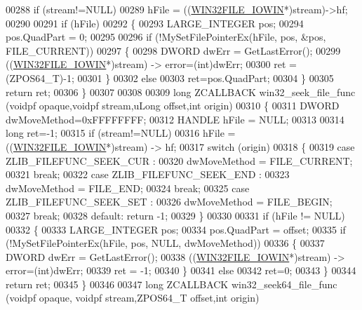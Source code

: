 \begin{DoxyCode}
00288     \textcolor{keywordflow}{if} (stream!=NULL)
00289         hFile = ((\hyperlink{struct_w_i_n32_f_i_l_e___i_o_w_i_n}{WIN32FILE\_IOWIN}*)stream)->hf;
00290 
00291     \textcolor{keywordflow}{if} (hFile)
00292     \{
00293         LARGE\_INTEGER pos;
00294         pos.QuadPart = 0;
00295 
00296         \textcolor{keywordflow}{if} (!MySetFilePointerEx(hFile, pos, &pos, FILE\_CURRENT))
00297         \{
00298             DWORD dwErr = GetLastError();
00299             ((\hyperlink{struct_w_i_n32_f_i_l_e___i_o_w_i_n}{WIN32FILE\_IOWIN}*)stream) -> error=(int)dwErr;
00300             ret = (ZPOS64\_T)-1;
00301         \}
00302         \textcolor{keywordflow}{else}
00303             ret=pos.QuadPart;
00304     \}
00305     \textcolor{keywordflow}{return} ret;
00306 \}
00307 
00308 
00309 \textcolor{keywordtype}{long} ZCALLBACK win32\_seek\_file\_func (voidpf opaque,voidpf stream,uLong offset,\textcolor{keywordtype}{int} origin)
00310 \{
00311     DWORD dwMoveMethod=0xFFFFFFFF;
00312     HANDLE hFile = NULL;
00313 
00314     \textcolor{keywordtype}{long} ret=-1;
00315     \textcolor{keywordflow}{if} (stream!=NULL)
00316         hFile = ((\hyperlink{struct_w_i_n32_f_i_l_e___i_o_w_i_n}{WIN32FILE\_IOWIN}*)stream) -> hf;
00317     \textcolor{keywordflow}{switch} (origin)
00318     \{
00319     \textcolor{keywordflow}{case} ZLIB\_FILEFUNC\_SEEK\_CUR :
00320         dwMoveMethod = FILE\_CURRENT;
00321         \textcolor{keywordflow}{break};
00322     \textcolor{keywordflow}{case} ZLIB\_FILEFUNC\_SEEK\_END :
00323         dwMoveMethod = FILE\_END;
00324         \textcolor{keywordflow}{break};
00325     \textcolor{keywordflow}{case} ZLIB\_FILEFUNC\_SEEK\_SET :
00326         dwMoveMethod = FILE\_BEGIN;
00327         \textcolor{keywordflow}{break};
00328     \textcolor{keywordflow}{default}: \textcolor{keywordflow}{return} -1;
00329     \}
00330 
00331     \textcolor{keywordflow}{if} (hFile != NULL)
00332     \{
00333         LARGE\_INTEGER pos;
00334         pos.QuadPart = offset;
00335         \textcolor{keywordflow}{if} (!MySetFilePointerEx(hFile, pos, NULL, dwMoveMethod))
00336         \{
00337             DWORD dwErr = GetLastError();
00338             ((\hyperlink{struct_w_i_n32_f_i_l_e___i_o_w_i_n}{WIN32FILE\_IOWIN}*)stream) -> error=(int)dwErr;
00339             ret = -1;
00340         \}
00341         \textcolor{keywordflow}{else}
00342             ret=0;
00343     \}
00344     \textcolor{keywordflow}{return} ret;
00345 \}
00346 
00347 \textcolor{keywordtype}{long} ZCALLBACK win32\_seek64\_file\_func (voidpf opaque, voidpf stream,ZPOS64\_T offset,\textcolor{keywordtype}{int} origin)

\end{DoxyCode}
